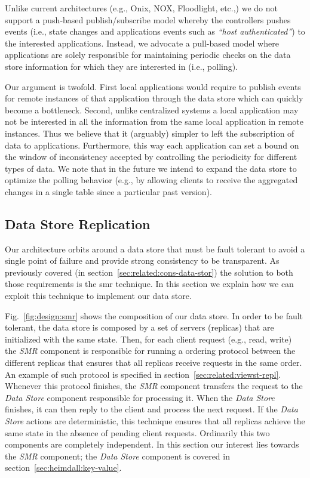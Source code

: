 Unlike current architectures (e.g., Onix, NOX, Floodlight, etc.,) we do not support a push-based publish/subscribe model whereby the controllers pushes events (i.e., state changes and applications events such as \emph{``host authenticated''}) to the interested applications.  
Instead, we advocate a pull-based model where applications are solely responsible for maintaining periodic checks on the data store information for which they are interested in (i.e., polling). 

Our argument is twofold. First local applications would require to publish events for remote instances of that application through the data store which can quickly become a bottleneck. Second, unlike centralized systems a local application may not be interested in all the information from the same local application in remote instances. 
Thus we believe that it (arguably) simpler to left the subscription of data to applications. 
Furthermore, this way each application can set a bound on the window of inconsistency accepted by controlling the periodicity for different types of data. 
We note that in the future we intend to expand the data store to optimize the polling  behavior (e.g., by allowing clients to receive the aggregated changes in a single table since a particular past version).

\subsection{Data Store Replication}
\label{sec:design:data-store-repl}



Our architecture orbits around a data store that must be fault tolerant to avoid a single point of failure and provide strong consistency to be transparent. 
As previously covered (in section~\ref{sec:related:cons-data-stor}) the solution to both those requirements is the \gls{smr}  technique. 
In this section we explain how we can exploit this technique to implement our data store. 

Fig.~\ref{fig:design:smr} shows the composition of our data store. 
In order to be fault tolerant, the data store is composed by a set of servers (replicas) that are initialized with the same state. 
Then, for each client request (e.g., read, write)  the \emph{SMR} component is responsible for running a ordering protocol between the different replicas that ensures that all replicas receive requests in the same order.
An example of such protocol is specified in  section~\ref{sec:related:viewst-repl}. Whenever this protocol finishes, the \emph{SMR} component transfers the request to the \emph{Data Store} component responsible for processing it. 
When the \emph{Data Store} finishes, it can then reply to the client and process the next request. 
If the \emph{Data Store} actions are deterministic, this technique ensures that all replicas achieve the same state in the absence of pending client requests. 
Ordinarily this two components are completely independent.  In this section our interest lies towards the \emph{SMR} component; the \emph{Data Store} component is covered in section~\ref{sec:heimdall:key-value}. 

